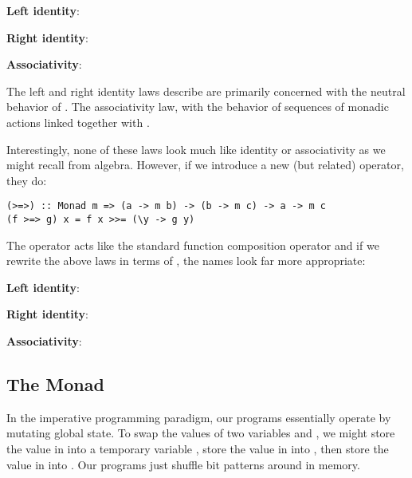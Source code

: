 \begin{notelist}
    \item \textbf{Left identity}: 
    \item \textbf{Right identity}: 
    \item \textbf{Associativity}: 
\end{notelist}

The left and right identity laws describe are primarily concerned with the neutral behavior of . The associativity
law, with the behavior of sequences of monadic actions linked together with \code{(>>=)}.

Interestingly, none of these laws look much like identity or associativity as we might recall from algebra. However, if we introduce
a new (but related) operator, they do:

\begin{lstlisting}
(>=>) :: Monad m => (a -> m b) -> (b -> m c) -> a -> m c
(f >=> g) x = f x >>= (\y -> g y)
\end{lstlisting}

The operator \code{(>=>)} acts like the standard function composition operator 
and if we rewrite the above laws in terms of \code{(>=>)}, the names look far more appropriate:

\begin{notelist}
    \item \textbf{Left identity}: 
    \item \textbf{Right identity}: 
    \item \textbf{Associativity}: 
\end{notelist}

\subsection{The  Monad}

In the imperative programming paradigm, our programs essentially operate by mutating global state. To swap the values of two variables 
 and , we might store the value in  into a temporary variable , store the value in  into ,
then store the value in  into . Our programs just shuffle bit patterns around in memory.

